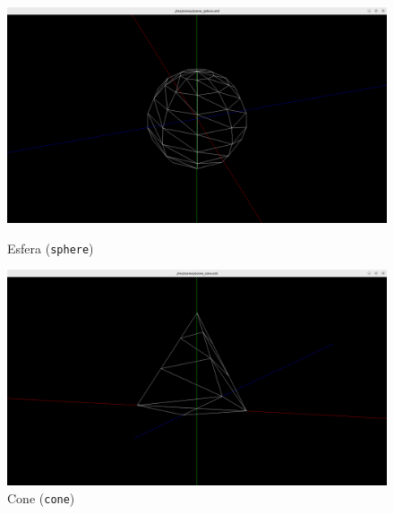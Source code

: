 \documentclass[12pt, a4paper]{article}
\begin{document}
\begin{figure}[H]
    \centering
    \begin{minipage}{0.48\textwidth}
        \centering
        \includegraphics[width=\textwidth]{res/results/Sphere.png}
        \caption{Esfera (\texttt{sphere})}
    \end{minipage}\hfill
    \begin{minipage}{0.48\textwidth}
        \centering
        \includegraphics[width=\textwidth]{res/results/Cone.png}
        \caption{Cone (\texttt{cone})}
    \end{minipage}\hfill
\end{figure}
\end{document}
